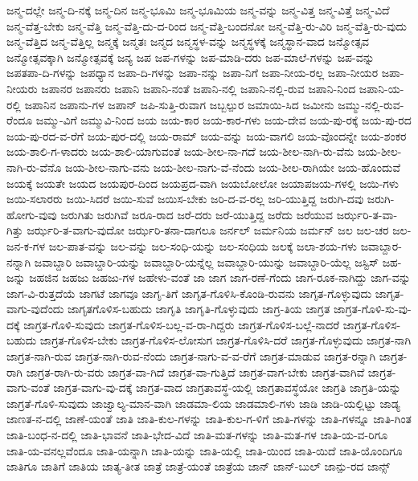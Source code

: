 {ಜನ್ಮ-ದಲ್ಲೇ
ಜನ್ಮ-ದಿ-ನಕ್ಕೆ
ಜನ್ಮ-ದಿನ
ಜನ್ಮ-ಭೂಮಿ
ಜನ್ಮ-ಭೂಮಿಯ
ಜನ್ಮ-ವನ್ನು
ಜನ್ಮ-ವಿತ್ತ
ಜನ್ಮ-ವಿತ್ತೆ
ಜನ್ಮ-ವಿದೆ
ಜನ್ಮ-ವೆತ್ತ-ಬೇಕು
ಜನ್ಮ-ವೆತ್ತಿ
ಜನ್ಮ-ವೆತ್ತಿ-ದು-ದ-ರಿಂದ
ಜನ್ಮ-ವೆತ್ತಿ-ಬಂದನೋ
ಜನ್ಮ-ವೆತ್ತಿ-ರು-ವಿರಿ
ಜನ್ಮ-ವೆತ್ತಿ-ರು-ವುದು
ಜನ್ಮ-ವೆತ್ತಿದ
ಜನ್ಮ-ವೆತ್ತಿಲ್ಲ
ಜನ್ಮಕ್ಕೆ
ಜನ್ಮತಃ
ಜನ್ಮದ
ಜನ್ಮಸ್ಥಳ-ವನ್ನು
ಜನ್ಮಸ್ಥಳಕ್ಕೆ
ಜನ್ಮಸ್ಥಾನ-ವಾದ
ಜನ್ಮೋತ್ಸವ
ಜನ್ಮೋತ್ಸವಕ್ಕಾಗಿ
ಜನ್ಮೋತ್ಸವಕ್ಕೆ
ಜನ್ಯ
ಜಪ
ಜಪ-ಗಳನ್ನು
ಜಪ-ಮಾಡಿ-ದರು
ಜಪ-ಮಾಲೆ-ಗಳನ್ನು
ಜಪ-ವನ್ನು
ಜಪತಪಾ-ದಿ-ಗಳನ್ನು
ಜಪಧ್ಯಾನ
ಜಪಾ-ದಿ-ಗಳನ್ನು
ಜಪಾ-ನನ್ನು
ಜಪಾ-ನಿಗೆ
ಜಪಾ-ನೀಯ-ರಲ್ಲ
ಜಪಾ-ನೀಯರ
ಜಪಾ-ನೀಯರು
ಜಪಾನರ
ಜಪಾನರು
ಜಪಾನಿ
ಜಪಾನಿ-ನಂತೆ
ಜಪಾನಿ-ನಲ್ಲಿ
ಜಪಾನಿ-ನಲ್ಲಿ-ರುವ
ಜಪಾನಿ-ನಿಂದ
ಜಪಾನಿ-ಯ-ರಲ್ಲಿ
ಜಪಾನಿನ
ಜಪಾನು-ಗಳ
ಜಪಾನ್
ಜಪಿ-ಸುತ್ತಿ-ರುವಾಗ
ಜಬ್ಬಲ್ಪುರ
ಜಮಾಯಿ-ಸಿದ
ಜಮೀನು
ಜಮ್ಮು-ನಲ್ಲಿ-ರುವ-ರೆಂದೂ
ಜಮ್ಮು-ವಿಗೆ
ಜಮ್ಮುವಿ-ನಿಂದ
ಜಯ
ಜಯ-ಕಾರ
ಜಯ-ಕಾರ-ಗಳು
ಜಯ-ದೇವ
ಜಯ-ಪು-ರಕ್ಕೆ
ಜಯ-ಪು-ರದ
ಜಯ-ಪು-ರದ-ವ-ರೆಗೆ
ಜಯ-ಪುರ-ದಲ್ಲಿ
ಜಯ-ರಾಮ್
ಜಯ-ವನ್ನು
ಜಯ-ವಾಗಲಿ
ಜಯ-ವೊಂದನ್ನೇ
ಜಯ-ಶಂಕರ
ಜಯ-ಶಾಲಿ-ಗ-ಳಾದರು
ಜಯ-ಶಾಲಿ-ಯಾಗುವಂತೆ
ಜಯ-ಶೀಲ-ನಾ-ಗದೆ
ಜಯ-ಶೀಲ-ನಾಗಿ-ರು-ವೆನು
ಜಯ-ಶೀಲ-ನಾಗಿ-ರು-ವೆನೊ
ಜಯ-ಶೀಲ-ನಾಗು-ವನು
ಜಯ-ಶೀಲ-ನಾಗು-ವೆ-ನೆಂದು
ಜಯ-ಶೀಲ-ರಾಗಿಯೇ
ಜಯ-ಹೊಂದುವೆ
ಜಯಕ್ಕೆ
ಜಯತೇ
ಜಯದ
ಜಯಪುರ-ದಿಂದ
ಜಯಪ್ರದ-ವಾಗಿ
ಜಯಬೋಲೋ
ಜಯಾಪಜಯ-ಗಳಲ್ಲಿ
ಜಯಿ-ಗಳು
ಜಯಿ-ಸಲಾರರು
ಜಯಿ-ಸಿದರೆ
ಜಯಿ-ಸುವೆ
ಜಯಿಸ-ಬೇಕು
ಜರಿ-ದ-ವ-ರಲ್ಲ
ಜರಿ-ಯುತ್ತಿದ್ದ
ಜರುಗಿ-ದವು
ಜರುಗಿ-ಹೋಗು-ವುವು
ಜರುಗಿತು
ಜರುಗಿವೆ
ಜರೂ-ರಾದ
ಜರೆ-ದರು
ಜರೆ-ಯುತ್ತಿದ್ದ
ಜರೆದು
ಜರೆಯುವ
ಜರ್ಝರಿ-ತ-ವಾ-ಗಿತ್ತು
ಜರ್ಝರಿ-ತ-ವಾಗು-ವುದೋ
ಜರ್ಝರಿ-ತನಾ-ದಾಗಲೂ
ಜರ್ನಲ್
ಜರ್ಮನಿಯ
ಜರ್ಮನ್
ಜಲ
ಜಲ-ಚರ
ಜಲ-ಜನ-ಕ-ಗಳ
ಜಲ-ಪಾತ-ವನ್ನು
ಜಲ-ವನ್ನು
ಜಲ-ಸಂಧಿ-ಯನ್ನು
ಜಲ-ಸಂಧಿಯ
ಜಲಕ್ಕೆ
ಜಲಾ-ಶಯ-ಗಳು
ಜವಾಬ್ದಾರ-ನನ್ನಾಗಿ
ಜವಾಬ್ದಾರಿ
ಜವಾಬ್ದಾರಿ-ಯನ್ನು
ಜವಾಬ್ದಾರಿ-ಯನ್ನೆಲ್ಲ
ಜವಾಬ್ದಾರಿ-ಯುನ್ನು
ಜವಾಬ್ದಾರಿ-ಯೆಲ್ಲ
ಜಸ್ಟಿಸ್
ಜಹ-ಜನ್ನು
ಜಹಜಿನ
ಜಹಜು
ಜಹಜು-ಗಳ
ಜಹೇಳು-ವಂತೆ
ಜಾ
ಜಾಗ
ಜಾಗ-ರಣೆ-ಗೆಂದು
ಜಾಗ-ರೂಕ-ನಾಗಿದ್ದು
ಜಾಗ-ವನ್ನು
ಜಾಗ-ವಿ-ರುತ್ತದೆಯೆ
ಜಾಗಟೆ
ಜಾಗವೂ
ಜಾಗೃ-ತಿಗೆ
ಜಾಗೃತ-ಗೊಳಿಸಿ-ಕೊಂಡಿ-ರುವನು
ಜಾಗೃತ-ಗೊಳ್ಳುವುದು
ಜಾಗೃತ-ವಾಗು-ವುದೆಂದು
ಜಾಗೃತಗೊಳಿಸ-ಬಹುದು
ಜಾಗೃತಿ
ಜಾಗೃತಿ-ಗೊಳ್ಳುವುದು
ಜಾಗ್ರ-ತಿಯ
ಜಾಗ್ರತ
ಜಾಗ್ರತ-ಗೊಳಿ-ಸು-ವು-ದಕ್ಕೆ
ಜಾಗ್ರತ-ಗೊಳಿ-ಸುವುದು
ಜಾಗ್ರತ-ಗೊಳಿಸ-ಬಲ್ಲ-ವ-ರಾ-ಗಿದ್ದರು
ಜಾಗ್ರತ-ಗೊಳಿಸ-ಬಲ್ಲೆ-ನಾದರೆ
ಜಾಗ್ರತ-ಗೊಳಿಸ-ಬಹುದು
ಜಾಗ್ರತ-ಗೊಳಿಸ-ಬೇಕು
ಜಾಗ್ರತ-ಗೊಳಿಸ-ಲೋಸುಗ
ಜಾಗ್ರತ-ಗೊಳಿಸಿ-ದರೆ
ಜಾಗ್ರತ-ಗೊಳ್ಳುವುದು
ಜಾಗ್ರತ-ನಾಗಿ
ಜಾಗ್ರತ-ನಾಗಿ-ರುವ
ಜಾಗ್ರತ-ನಾಗಿ-ರುವ-ನೆಂದು
ಜಾಗ್ರತ-ನಾಗು-ವ-ವ-ರೆಗೆ
ಜಾಗ್ರತ-ಮಾಡುವ
ಜಾಗ್ರತ-ರನ್ನಾಗಿ
ಜಾಗ್ರತ-ರಾಗಿ
ಜಾಗ್ರತ-ರಾಗಿ-ರು-ವರು
ಜಾಗ್ರತ-ವಾ-ಗಿದೆ
ಜಾಗ್ರತ-ವಾ-ಗುತ್ತಿದೆ
ಜಾಗ್ರತ-ವಾಗ-ಬೇಕು
ಜಾಗ್ರತ-ವಾಗಿವೆ
ಜಾಗ್ರತ-ವಾಗು-ವಂತೆ
ಜಾಗ್ರತ-ವಾಗು-ವು-ದಕ್ಕೆ
ಜಾಗ್ರತ-ವಾದ
ಜಾಗ್ರತಾವಸ್ಥೆ-ಯಲ್ಲಿ
ಜಾಗ್ರತಾವಸ್ಥೆಯೋ
ಜಾಗ್ರತಿ
ಜಾಗ್ರತಿ-ಯನ್ನು
ಜಾಗ್ರತೆ-ಗೊಳಿ-ಸುವುದು
ಜಾಜ್ವಾಲ್ಯ-ಮಾನ-ವಾಗಿ
ಜಾಡಮಾ-ಲಿಯ
ಜಾಡಮಾಲಿ-ಗಳು
ಜಾಡಿ
ಜಾಡಿ-ಯಲ್ಲಿಟ್ಟು
ಜಾಡ್ಯ
ಜಾಣತ-ನ-ದಲ್ಲಿ
ಜಾಣೆ-ಯಂತೆ
ಜಾತಿ
ಜಾತಿ-ಕುಲ-ಗಳನ್ನು
ಜಾತಿ-ಕುಲ-ಗ-ಳಿಗೆ
ಜಾತಿ-ಗಳನ್ನು
ಜಾತಿ-ಗಳನ್ನೂ
ಜಾತಿ-ಗಿಂತ
ಜಾತಿ-ಬಂಧ-ನ-ದಲ್ಲಿ
ಜಾತಿ-ಭಾವನೆ
ಜಾತಿ-ಭೇದ-ವಿದೆ
ಜಾತಿ-ಮತ-ಗಳನ್ನು
ಜಾತಿ-ಮತ-ಗಳ
ಜಾತಿ-ಯ-ವ-ರಿಗೂ
ಜಾತಿ-ಯ-ವನಲ್ಲವೆಂದೂ
ಜಾತಿ-ಯನ್ನಾಗಿ
ಜಾತಿ-ಯನ್ನು
ಜಾತಿ-ಯಲ್ಲಿ
ಜಾತಿ-ಯಿಂದ
ಜಾತಿ-ಯಿದೆ
ಜಾತಿ-ಯೊಂದಿಗೂ
ಜಾತಿಗೂ
ಜಾತಿಗೆ
ಜಾತಿಯ
ಜಾತ್ಯ-ತೀತ
ಜಾತ್ರೆ
ಜಾತ್ರೆ-ಯಂತೆ
ಜಾತ್ರೆಯ
ಜಾನ್
ಜಾನ್-ಬುಲ್
ಜಾನ್ಪು-ರದ
ಜಾನ್ಸ್
}

